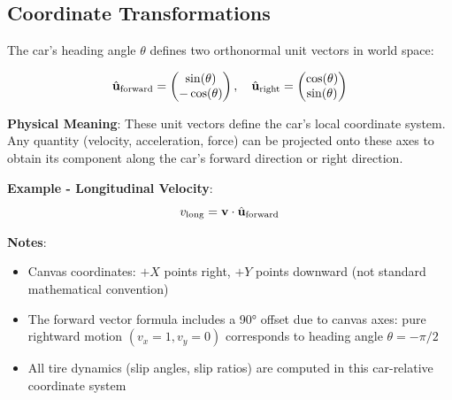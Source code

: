 \subsection{Coordinate Transformations}

The car's heading angle $\theta$ defines two orthonormal unit vectors in world space:

\begin{equation}
  \hat{\mathbf{u}}_{\text{forward}} = \begin{pmatrix} \sin(\theta) \\ -\cos(\theta) \end{pmatrix}, \quad
  \hat{\mathbf{u}}_{\text{right}} = \begin{pmatrix} \cos(\theta) \\ \sin(\theta) \end{pmatrix}
  \label{eq:unit-vectors}
\end{equation}

\textbf{Physical Meaning}: These unit vectors define the car's local coordinate system. Any quantity (velocity, acceleration, force) can be projected onto these axes to obtain its component along the car's forward direction or right direction.

\textbf{Example - Longitudinal Velocity}:
\begin{equation}
  v_{\text{long}} = \mathbf{v} \cdot \hat{\mathbf{u}}_{\text{forward}}
\end{equation}

\textbf{Notes}:
\begin{itemize}
  \item Canvas coordinates: $+X$ points right, $+Y$ points downward (not standard mathematical convention)
  \item The forward vector formula includes a 90° offset due to canvas axes: pure rightward motion $(v_x = 1, v_y = 0)$ corresponds to heading angle $\theta = -\pi/2$
  \item All tire dynamics (slip angles, slip ratios) are computed in this car-relative coordinate system
\end{itemize}

\newpage

